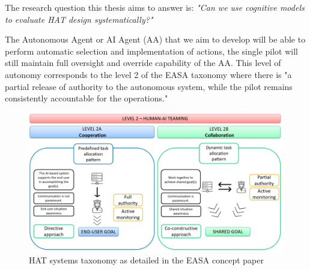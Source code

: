 \documentclass[12pt,a4paper]{article} %
\begin{document}
	The research question this thesis aims to answer is: \textit{"Can we use cognitive models to evaluate HAT design systematically?"}

	The Autonomous Agent or AI Agent (AA) that we aim to develop will be able to perform automatic selection and implementation of actions, the single pilot will still maintain full oversight and override capability of the AA. This level of autonomy corresponds to the level 2 of the EASA taxonomy where there is "a partial release of authority to the autonomous system, while the pilot remains consistently accountable for the operations." \parencite{easa_guidance_2024}


	\begin{figure}[H]
		\centering
		\includegraphics[width=1.0\textwidth]{./images/easa_taxo.png}
		\caption{HAT systems taxonomy as detailed in the EASA concept paper \parencite{easa_guidance_2024}}
		\label{fig:easa-taxo}
	\end{figure}
	
\end{document}
